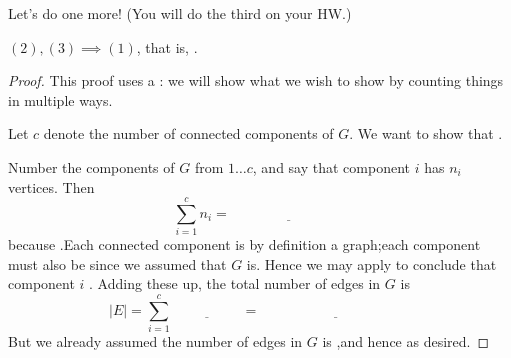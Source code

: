 \documentclass{tufte-handout}
\begin{document}
Let's do one more!  (You will do the third on your HW.)

\begin{lem}
  $(2),(3) \implies (1)$, that is, \blank\linebreak \mbox{}\blank.
\end{lem}

\begin{proof}
  This proof uses a : we will show what we
  wish to show by counting things in multiple ways.

  Let $c$ denote the number of connected components of $G$.  We want
  to show that \blank.

  Number the components of $G$ from $1 \dots c$, and say that
  component $i$ has $n_i$ vertices.  Then \[ \sum_{i=1}^c n_i =
    \underline{\phantom{XXXXXXXXXX}} \] because \blank.\linebreak  Each
  connected component is by definition a \blank graph;\linebreak each
  component must also be \blank\linebreak since we assumed that $G$ is.  Hence
  we may apply  to conclude that component $i$
  \blank.\linebreak
  Adding these up, the total number of edges in $G$ is
  \[ |E| = \sum_{i=1}^c \underline{\phantom{XXXXXX}} =
    \underline{\phantom{XXXXXXXXXXXXX}} \] But we already assumed the
  number of edges in $G$ is \blank,\linebreak and hence \blank as desired.
\end{proof}
\end{document}
